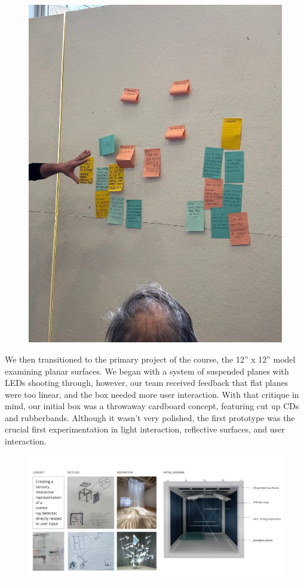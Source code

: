 \documentclass{article}
\begin{document}
\begin{figure} [h]
\begin{minipage}[b]{0.4\textwidth}
    \includegraphics[width=\textwidth]{images/unnamed2.jpg}
  \end{minipage}
\end{figure}

We then transitioned to the primary project of the course, the 12” x 12” model examining planar surfaces. We began with a system of suspended planes with LEDs shooting through, however, our team received feedback that flat planes were too linear, and the box needed more user interaction. With that critique in mind, our initial box was a throwaway cardboard concept, featuring cut up CDs and rubberbands. Although it wasn’t very polished, the first prototype was the crucial first experimentation in light interaction, reflective surfaces, and user interaction.

\begin{figure} [h]
    \includegraphics[width=1\linewidth]{images/unnamed3.png}
\end{figure}
\end{document}
